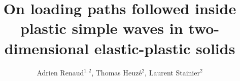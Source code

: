 \documentclass[final,3p,times]{elsarticle}
\begin{document}
\begin{frontmatter}



  
  \title{On loading paths followed inside plastic simple waves in two-dimensional elastic-plastic solids}
  
  
  \author{Adrien Renaud$^{1,2}$, Thomas Heuz{\'e}$^2$, Laurent Stainier$^2$}
  \address{$^1$ Laboratory MSSMat (UMR 8579 CNRS)\\
    CentraleSup{\'e}lec, Universit{\'e} Paris-Saclay\\
    8-10 rue Joliot-Curie, 91190 Gif-sur-Yvette\\
    e-mail: adrien.renaud@centralesupelec.fr }

  \address{$^2$ Research Institute in Civil and Mechanical Engineering (GeM, UMR 6183 CNRS)\\
    Ecole Centrale de Nantes \\
    1 rue de la No\"e, Nantes\\
    e-mail: \{thomas.heuze,laurent.stainier\}@ec-nantes.fr}
  

\end{frontmatter}
\end{document}
